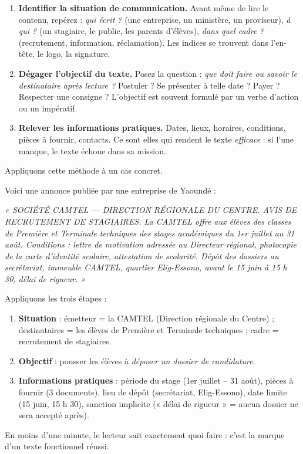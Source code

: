 \documentclass[11pt]{article}
\begin{document}
\begin{methode}
\begin{enumerate}
\item \textbf{Identifier la situation de communication.} Avant même de lire le contenu, repérez : \emph{qui écrit ?} (une entreprise, un ministère, un proviseur), \emph{à qui ?} (un stagiaire, le public, les parents d'élèves), \emph{dans quel cadre ?} (recrutement, information, réclamation). Les indices se trouvent dans l'en-tête, le logo, la signature.
\item \textbf{Dégager l'objectif du texte.} Posez la question : \emph{que doit faire ou savoir le destinataire après lecture ?} Postuler ? Se présenter à telle date ? Payer ? Respecter une consigne ? L'objectif est souvent formulé par un verbe d'action ou un impératif.
\item \textbf{Relever les informations pratiques.} Dates, lieux, horaires, conditions, pièces à fournir, contacts. Ce sont elles qui rendent le texte \emph{efficace} : si l'une manque, le texte échoue dans sa mission.
\end{enumerate}
\end{methode}

Appliquons cette méthode à un cas concret.

\begin{exemplebox}
Voici une annonce publiée par une entreprise de Yaoundé :

\emph{« SOCIÉTÉ CAMTEL — DIRECTION RÉGIONALE DU CENTRE. AVIS DE RECRUTEMENT DE STAGIAIRES. La CAMTEL offre aux élèves des classes de Première et Terminale techniques des stages académiques du 1er juillet au 31 août. Conditions : lettre de motivation adressée au Directeur régional, photocopie de la carte d'identité scolaire, attestation de scolarité. Dépôt des dossiers au secrétariat, immeuble CAMTEL, quartier Elig-Essono, avant le 15 juin à 15 h 30, délai de rigueur. »}

Appliquons les trois étapes :
\begin{enumerate}
\item \textbf{Situation} : émetteur = la CAMTEL (Direction régionale du Centre) ; destinataires = les élèves de Première et Terminale techniques ; cadre = recrutement de stagiaires.
\item \textbf{Objectif} : pousser les élèves à \emph{déposer un dossier de candidature}.
\item \textbf{Informations pratiques} : période du stage (1er juillet – 31 août), pièces à fournir (3 documents), lieu de dépôt (secrétariat, Elig-Essono), date limite (15 juin, 15 h 30), sanction implicite (« délai de rigueur » = aucun dossier ne sera accepté après).
\end{enumerate}
En moins d'une minute, le lecteur sait exactement quoi faire : c'est la marque d'un texte fonctionnel réussi.
\end{exemplebox}
\end{document}
